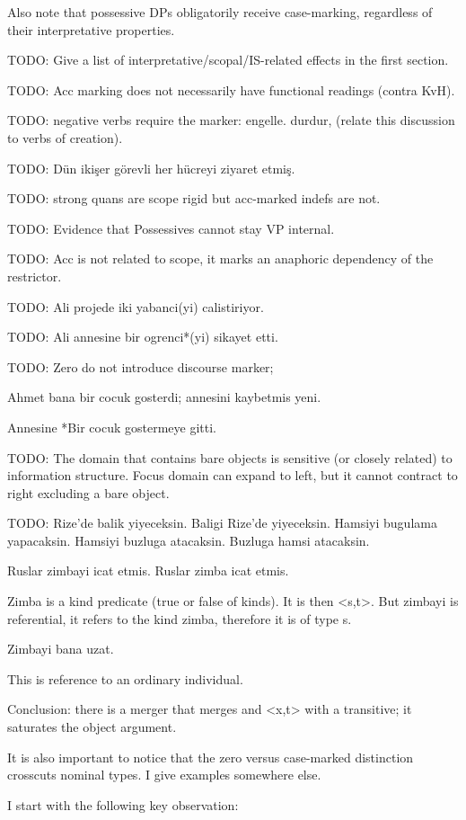 \documentclass[11pt,a4paper]{article}
\begin{document}
Also note that possessive DPs obligatorily receive case-marking, regardless of their interpretative properties.

TODO: Give a list of interpretative/scopal/IS-related effects in the first section.

TODO: Acc marking does not necessarily have functional readings (contra KvH).

TODO: negative verbs require the marker: engelle. durdur, (relate this discussion to verbs of creation).

TODO: Dün ikişer görevli her hücreyi ziyaret etmiş.

TODO: strong quans are scope rigid but acc-marked indefs are not.

TODO: Evidence that Possessives cannot stay VP internal.

TODO: Acc is not related to scope, it marks an anaphoric dependency of the restrictor.

TODO: Ali projede iki yabanci(yi) calistiriyor.

TODO: Ali annesine bir ogrenci*(yi) sikayet etti.

TODO: Zero do not introduce discourse marker;

Ahmet bana bir cocuk gosterdi; annesini kaybetmis yeni. 

Annesine *Bir cocuk gostermeye gitti.

TODO: The domain that contains bare objects is sensitive (or closely related) to information structure. Focus domain can expand to left, but it cannot contract to right excluding a bare object.

TODO: 
Rize'de balik yiyeceksin.
Baligi Rize'de yiyeceksin. 
Hamsiyi bugulama yapacaksin.
Hamsiyi buzluga atacaksin. 
Buzluga hamsi atacaksin.

Ruslar zimbayi icat etmis.
Ruslar zimba icat etmis.

Zimba is a kind predicate (true or false of kinds). It is then <s,t>. But zimbayi is referential, it refers to the kind zimba, therefore it is of type s.

Zimbayi bana uzat.

This is reference to an ordinary individual.

Conclusion: there is a merger that merges and <x,t> with a transitive; it saturates the object argument.


It is also important to notice that the zero versus case-marked distinction crosscuts nominal types. I give examples somewhere else.

I start with the following key observation:
\end{document}

